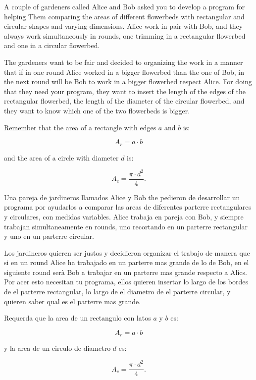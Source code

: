 



\ExamNameLine
\ExamStandardBoxEn
A couple of gardeners called Alice and Bob asked you to develop a program for helping Them
comparing the areas of different
flowerbeds with rectangular and circular shapes and varying dimensions. Alice work in pair
with Bob, and they always work simultaneously in rounds, one trimming in a rectangular
flowerbed and one in a circular flowerbed.

The gardeners want to be
fair and decided to organizing the work in a manner that if in one
round Alice worked in a bigger flowerbed than the one of Bob, in the next round
will be Bob to work in a bigger flowerbed respect Alice. For doing
that they need your program, they want to insert the length of the
edges of the rectangular flowerbed, the length of the diameter of
the circular flowerbed, and they want to know which one of the two
flowerbeds is bigger.

Remember that the area of a rectangle with edges $a$ and $b$ is:
\begin{center}
  \begin{equation*}
    A_r = a\cdot b
  \end{equation*}
\end{center}
and the area of a circle with diameter $d$ is:
\begin{center}
  \begin{equation*}
    A_c = \frac{\pi \cdot d^2}{4}.
  \end{equation*}
\end{center}
\newpage
\ExamNameLine
\ExamStandardBoxEs
Una pareja de jardineros llamados Alice y Bob the pedieron de
desarrollar un programa por ayudarlos a comparar las areas de
diferentes parterre rectangulares y circulares, con medidas
variables. Alice trabaja en pareja con Bob, y siempre trabajan
simultaneamente en rounds, uno recortando en un parterre rectangular y
uno en un parterre circular.

Los jardineros quieren ser justos y decidieron organizar el trabajo de
manera que si en un round Alice ha trabajado en un parterre mas grande
de lo de Bob, en el siguiente round ser\`a Bob a trabajar en un
parterre mas grande respecto a Alics. Por acer esto necesitan tu
programa, ellos quieren insertar lo largo de los bordes de el
parterre rectangular, lo largo de el diametro de el parterre circular,
y quieren saber qual es el parterre mas grande.

Requerda que la area de un rectangulo con latos $a$ y $b$ es:
\begin{center}
  \begin{equation*}
    A_r = a\cdot b
  \end{equation*}
\end{center}
y la area de un circulo de diametro $d$ es:
\begin{center}
  \begin{equation*}
    A_c = \frac{\pi \cdot d^2}{4}.
  \end{equation*}
\end{center}


